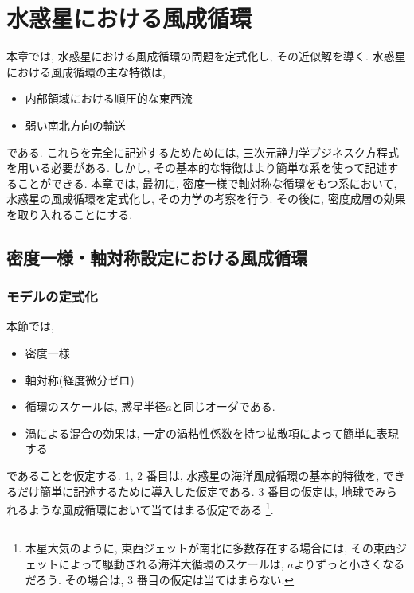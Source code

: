 \chapter{水惑星における風成循環}

本章では, 水惑星における風成循環の問題を定式化し, その近似解を導く. 
水惑星における風成循環の主な特徴は, 
\begin{itemize}
 \item 内部領域における順圧的な東西流
 \item 弱い南北方向の輸送
\end{itemize}
である. 
これらを完全に記述するためためには, 三次元静力学ブジネスク方程式を用いる必要がある. 
しかし, その基本的な特徴はより簡単な系を使って記述することができる. 
本章では, 最初に, 密度一様で軸対称な循環をもつ系において, 
水惑星の風成循環を定式化し, その力学の考察を行う. 
その後に, 密度成層の効果を取り入れることにする. 

\section{密度一様・軸対称設定における風成循環}
\subsection{モデルの定式化}

本節では, 
\begin{itemize}
 \item 密度一様
 \item 軸対称(経度微分ゼロ)
 \item 循環のスケールは, 惑星半径$a$と同じオーダである. 
 \item 渦による混合の効果は, 一定の渦粘性係数を持つ拡散項によって簡単に表現する
\end{itemize}
であることを仮定する. 
1, 2 番目は, 水惑星の海洋風成循環の基本的特徴を, 
できるだけ簡単に記述するために導入した仮定である. 
3 番目の仮定は, 地球でみられるような風成循環において当てはまる仮定である%
\footnote{
木星大気のように, 東西ジェットが南北に多数存在する場合には, 
その東西ジェットによって駆動される海洋大循環のスケールは, $a$よりずっと小さくなるだろう. 
その場合は, 3 番目の仮定は当てはまらない. 
}.

